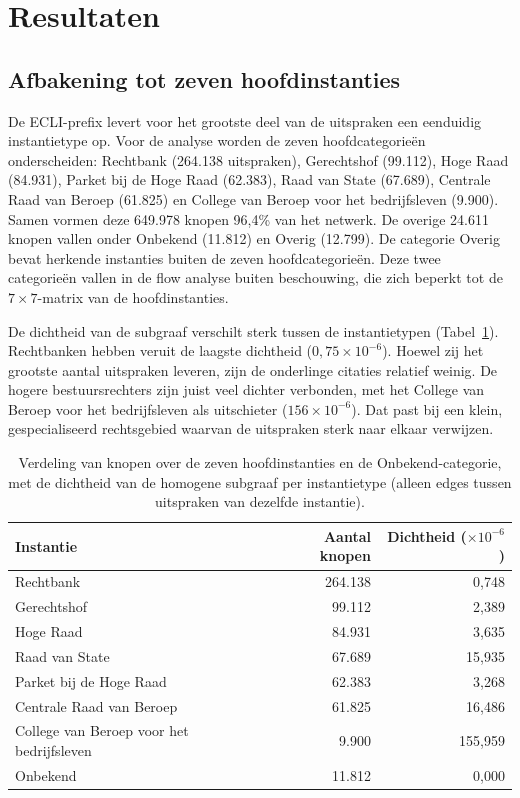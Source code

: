 \documentclass[a4paper, 12pt]{report}
\begin{document}
\section{Resultaten}

\subsection{Afbakening tot zeven hoofdinstanties} 
De ECLI-prefix levert voor het grootste deel van de uitspraken een eenduidig instantietype op. Voor de analyse worden de zeven hoofdcategorieën onderscheiden: Rechtbank (264.138 uitspraken), Gerechtshof (99.112), Hoge Raad (84.931), Parket bij de Hoge Raad (62.383), Raad van State (67.689), Centrale Raad van Beroep (61.825) en College van Beroep voor het bedrijfsleven (9.900). Samen vormen deze 649.978 knopen 96,4\% van het netwerk. De overige 24.611 knopen vallen onder Onbekend (11.812) en Overig (12.799). De categorie Overig bevat herkende instanties buiten de zeven hoofdcategorieën. Deze twee categorieën vallen in de flow analyse buiten beschouwing, die zich beperkt tot de $7 \times 7$-matrix van de hoofdinstanties.

De dichtheid van de subgraaf verschilt sterk tussen de instantietypen (Tabel~\ref{tab:dv5-instanties}). Rechtbanken hebben veruit de laagste dichtheid ($0{,}75 \times 10^{-6}$). Hoewel zij het grootste aantal uitspraken leveren, zijn de onderlinge citaties relatief weinig.  De hogere bestuursrechters zijn juist veel dichter verbonden, met het College van Beroep voor het bedrijfsleven als uitschieter ($156 \times 10^{-6}$). Dat past bij een klein, gespecialiseerd rechtsgebied waarvan de uitspraken sterk naar elkaar verwijzen.


\begin{table}[H]
  \centering
  \caption{Verdeling van knopen over de zeven hoofdinstanties en de Onbekend-categorie, met de dichtheid van de homogene subgraaf per instantietype (alleen edges tussen uitspraken van dezelfde instantie).}
  \label{tab:dv5-instanties}
  \begin{tabular}{lrr}
    \toprule
    Instantie & Aantal knopen & Dichtheid ($\times 10^{-6}$) \\
    \midrule
    Rechtbank                                  & 264.138 & 0,748 \\
    Gerechtshof                                & 99.112  & 2,389 \\
    Hoge Raad                                  & 84.931  & 3,635 \\
    Raad van State                             & 67.689  & 15,935 \\
    Parket bij de Hoge Raad                    & 62.383  & 3,268 \\
    Centrale Raad van Beroep                   & 61.825  & 16,486 \\
    College van Beroep voor het bedrijfsleven  & 9.900   & 155,959 \\
    Onbekend                                   & 11.812  & 0,000 \\
    \bottomrule
  \end{tabular}
\end{table}
\end{document}
